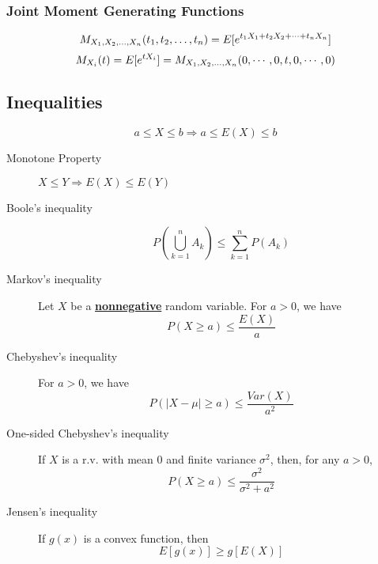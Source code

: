 \documentclass{article}
\begin{document}
\begin{multicols}{2}
\subsubsection*{Joint Moment Generating Functions}
$$M_{\small{X_1,X_2,\dots,X_n}}(t_1,t_2,\dots,t_n) = E[e^{t_1X_1 + t_2X_2 + \dots + t_nX_n}]$$
$$M_{X_i}(t)= E[e^{tX_i}] = M_{\small{X_1,X_2,\dots,X_n}}(0,\cdots,0,t,0,\cdots,0)$$
\subsection{Inequalities}
$$a\leq X \leq b \Rightarrow a\leq E(X) \leq b$$
\begin{description}
 \item[Monotone Property] $X \leq Y \Rightarrow E(X) \leq E(Y)$ 
 \item[Boole's inequality] $$P\left(\bigcup_{k=1}^n A_k\right) \leq \sum_{k=1}^nP(A_k)$$
 \item[Markov's inequality] Let $X$ be a \underline{\textbf{nonnegative}} random variable. For $a > 0$, we have
 $$P(X\geq a) \leq \frac{E(X)}{a}$$
 \item[Chebyshev's inequality] For $a > 0$, we have
 $$P(|X-\mu|\geq a) \leq \frac{Var(X)}{a^2}$$
 \item[One-sided Chebyshev's inequality] If $X$ is a r.v. with mean $0$ and finite variance $\sigma^2$, then, for any $a > 0$, 
 $$P(X\geq a) \leq \frac{\sigma^2}{\sigma^2+a^2}$$
 \item[Jensen's inequality] If $g(x)$ is a convex function, then 
 $$E[g(x)] \geq g[E(X)]$$
\end{description}

\end{multicols}
\end{document}
